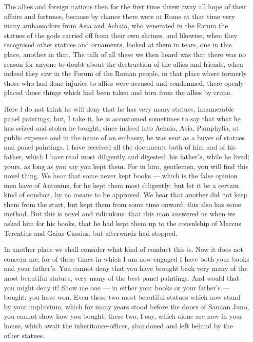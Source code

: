  The allies and foreign nations then for the first time threw away all hope of their affairs and fortunes, because by chance there were at Rome at that time very many ambassadors from Asia and Achaia, who venerated in the Forum the statues of the gods carried off from their own shrines, and likewise, when they recognised other statues and ornaments, looked at them in tears, one in this place, another in that. The talk of all these we then heard was that there was no reason for anyone to doubt about the destruction of the allies and friends, when indeed they saw in the Forum of the Roman people, in that place where formerly those who had done injuries to allies were accused and condemned, there openly placed those things which had been taken and torn from the allies by crime.

 Here I do not think he will deny that he has very many statues, innumerable panel paintings; but, I take it, he is accustomed sometimes to say that what he has seized and stolen he bought, since indeed into Achaia, Asia, Pamphylia, at public expense and in the name of an embassy, he was sent as a buyer of statues and panel paintings. I have received all the documents both of him and of his father, which I have read most diligently and digested: his father's, while he lived; yours, as long as you say you kept them. For in him, gentlemen, you will find this novel thing. We hear that some never kept books --- which is the false opinion men have of Antonius, for he kept them most diligently; but let it be a certain kind of conduct, by no means to be approved. We hear that another did not keep them from the start, but kept them from some time onward; this also has some method. But this is novel and ridiculous: that this man answered us when we asked him for his books, that he had kept them up to the consulship of Marcus Terentius and Gaius Cassius, but afterwards had stopped.

 In another place we shall consider what kind of conduct this is. Now it does not concern me; for of these times in which I am now engaged I have both your books and your father's. You cannot deny that you have brought back very many of the most beautiful statues, very many of the best panel paintings. And would that you might deny it! Show me one --- in either your books or your father's --- bought: you have won. Even those two most beautiful statues which now stand by your impluvium, which for many years stood before the doors of Samian Juno, you cannot show how you bought; these two, I say, which alone are now in your house, which await the inheritance-officer, abandoned and left behind by the other statues.

